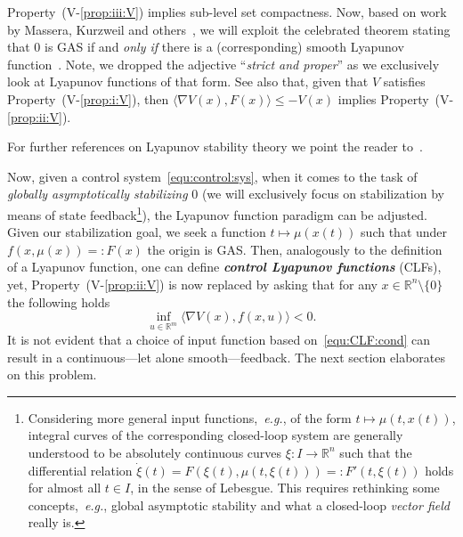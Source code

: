 \documentclass[letterpaper, 10 pt, conference]{ieeeconf}  %
\theoremstyle{mystyle}
\begin{document}
Property~(V-\ref{prop:iii:V}) implies sub-level set compactness. 
Now, based on work by Massera, Kurzweil and others~\cite{ref:kurzweil1963inversion,ref:fathi2019smoothing}, we will exploit the celebrated theorem stating that $0$ is GAS if and \textit{only if} there is a (corresponding) smooth Lyapunov function~\cite[Thm.~2.4]{ref:bacciotti2005liapunov}. Note, we dropped the adjective ``\textit{strict and proper}'' as we exclusively look at Lyapunov functions of that form. See also that, given that $V$ satisfies Property~(V-\ref{prop:i:V}), then $\langle \nabla V(x),F(x)\rangle \leq -V(x)$ implies Property~(V-\ref{prop:ii:V}).  

For further references on Lyapunov stability theory we point the reader to~\cite{ref:bhatia1970stability,ref:sontag2013mathematical,ref:bacciotti2005liapunov}. 

Now, given a control system~\eqref{equ:control:sys}, when it comes to the task of \textit{globally asymptotically stabilizing} $0$ (we will exclusively focus on stabilization by means of state feedback\footnote{Considering more general input functions,~\textit{e.g.}, of the form $t\mapsto \mu(t,x(t))$, integral curves of the corresponding closed-loop system are generally understood to be absolutely continuous curves $\xi:I\to \mathbb{R}^n$ such that the differential relation $\dot{\xi}(t)=F(\xi(t),\mu(t,\xi(t)))=:F'(t,\xi(t))$ holds for almost all $t\in I$, in the sense of Lebesgue. This requires rethinking some concepts,~\textit{e.g.}, global asymptotic stability and what a closed-loop \textit{vector field} really is.}), the Lyapunov function paradigm can be adjusted. Given our stabilization goal, we seek a function $t\mapsto \mu(x(t))$ such that under $f(x,\mu(x))=:F(x)$ the origin is GAS. Then, analogously to the definition of a Lyapunov function, one can define \textit{\textbf{control Lyapunov functions}} (CLFs), yet, Property~(V-\ref{prop:ii:V}) is now replaced by asking that for any $x\in \mathbb{R}^n\setminus\{0\}$ the following holds
\begin{equation}
\label{equ:CLF:cond}
    \inf_{u\in \mathbb{R}^m}\langle \nabla V(x), f(x,u) \rangle < 0. 
\end{equation}
It is not evident that a choice of input function based on~\eqref{equ:CLF:cond} can result in a continuous---let alone smooth---feedback. The next section elaborates on this problem.
\end{document}
